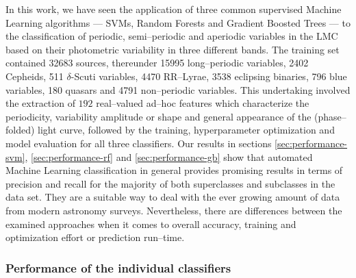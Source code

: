 In this work, we have seen the application of three common supervised Machine Learning algorithms --- SVMs, Random Forests and Gradient Boosted Trees --- to the classification of periodic, semi--periodic and aperiodic variables in the LMC based on their photometric variability in three different bands. The training set contained 32683 sources, thereunder 15995 long--periodic variables, 2402 Cepheids, 511 $\delta$-Scuti variables, 4470 RR--Lyrae, 3538 eclipsing binaries, 796 blue variables, 180 quasars and 4791 non--periodic variables. This undertaking involved the extraction of $192$ real--valued ad--hoc features which characterize the periodicity, variability amplitude or shape and general appearance of the (phase--folded) light curve, followed by the training, hyperparameter optimization and model evaluation for all three classifiers. Our results in sections \ref{sec:performance-svm}, \ref{sec:performance-rf} and \ref{sec:performance-gb} show that automated Machine Learning classification in general provides promising results in terms of precision and recall for the majority of both superclasses and subclasses in the data set. They are a suitable way to deal with the ever growing amount of data from modern astronomy surveys. Nevertheless, there are differences between the examined approaches when it comes to overall accuracy, training and optimization effort or prediction run--time.\\

\subsubsection*{Performance of the individual classifiers}

